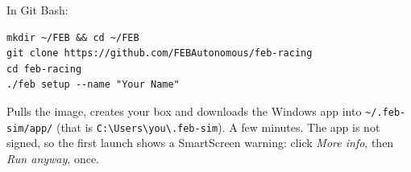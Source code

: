 In Git Bash:

\begin{lstlisting}
mkdir ~/FEB && cd ~/FEB
git clone https://github.com/FEBAutonomous/feb-racing
cd feb-racing
./feb setup --name "Your Name"
\end{lstlisting}

Pulls the image, creates your box and downloads the Windows app into \texttt{\textasciitilde/.feb-sim/app/}
(that is \texttt{C:\textbackslash Users\textbackslash you\textbackslash.feb-sim}). A few minutes.
The app is not signed, so the first launch shows a SmartScreen warning: click \emph{More info},
then \emph{Run anyway}, once.

